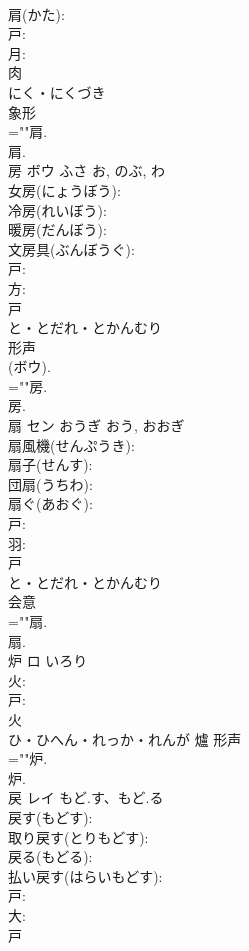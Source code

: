 \documentclass[8pt]{extreport}
\begin{document}
\begin{CJK}{UTF8}{min}
\\	肩(かた): 
\\	戸: 
\\	月: 
\\	肉	
\\	にく・にくづき	
\\	象形 
\\	=""肩.
\\	肩.
\\	房	ボウ	ふさ	お, のぶ, わ	
\\	女房(にょうぼう): 
\\	冷房(れいぼう): 
\\	暖房(だんぼう): 
\\	文房具(ぶんぼうぐ): 
\\	戸: 
\\	方: 
\\	戸	
\\	と・とだれ・とかんむり	
\\	形声 
\\	(ボウ).
\\	=""房.
\\	房.
\\	扇	セン	おうぎ	おう, おおぎ	
\\	扇風機(せんぷうき): 
\\	扇子(せんす): 
\\	団扇(うちわ): 
\\	扇ぐ(あおぐ): 
\\	戸: 
\\	羽: 
\\	戸	
\\	と・とだれ・とかんむり	
\\	会意 
\\	=""扇.
\\	扇.
\\	炉	ロ	いろり		
\\	火: 
\\	戸: 
\\	火	
\\	ひ・ひへん・れっか・れんが	爐	形声 
\\	=""炉.
\\	炉.
\\	戻	レイ	もど.す、もど.る		
\\	戻す(もどす): 
\\	取り戻す(とりもどす): 
\\	戻る(もどる): 
\\	払い戻す(はらいもどす): 
\\	戸: 
\\	大: 
\\	戸	

\end{CJK}
\end{document}
